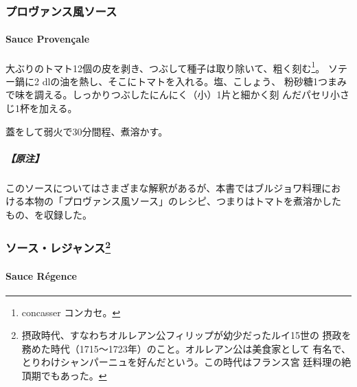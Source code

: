 \begin{recette}
\maeaki

\hypertarget{ux30d7ux30edux30f4ux30a1ux30f3ux30b9ux98a8ux30bdux30fcux30b9}{%
\subsubsection{プロヴァンス風ソース}\label{ux30d7ux30edux30f4ux30a1ux30f3ux30b9ux98a8ux30bdux30fcux30b9}}

\hypertarget{sauce-provencal}{%
\paragraph{Sauce Provençale}\label{sauce-provencal}}

 

大ぶりのトマト12個の皮を剥き、つぶして種子は取り除いて、粗く刻む\footnote{concasser
  コンカセ。}。 ソテー鍋に2\undemi{}
dlの油を熱し、そこにトマトを入れる。塩、こしょう、
粉砂糖1つまみで味を調える。しっかりつぶしたにんにく（小）1片と細かく刻
んだパセリ小さじ1杯を加える。

蓋をして弱火で30分間程、煮溶かす。

\hypertarget{ux539fux6ce8-7}{%
\subparagraph{【原注】}\label{ux539fux6ce8-7}}

このソースについてはさまざまな解釈があるが、本書ではブルジョワ料理にお
ける本物の「プロヴァンス風ソース」のレシピ、つまりはトマトを煮溶かした
もの、を収録した。

\maeaki

\hypertarget{ux30bdux30fcux30b9ux30ecux30b8ux30e3ux30f3ux30b975}{%
\subsubsection[ソース・レジャンス]{\texorpdfstring{ソース・レジャンス\footnote{摂政時代、すなわちオルレアン公フィリップが幼少だったルイ15世の
  摂政を務めた時代（1715〜1723年）のこと。オルレアン公は美食家として
  有名で、とりわけシャンパーニュを好んだという。この時代はフランス宮
  廷料理の絶頂期でもあった。}}{ソース・レジャンス}}\label{ux30bdux30fcux30b9ux30ecux30b8ux30e3ux30f3ux30b975}}

\hypertarget{sauce-regence}{%
\paragraph{Sauce Régence}\label{sauce-regence}}


\end{recette}
